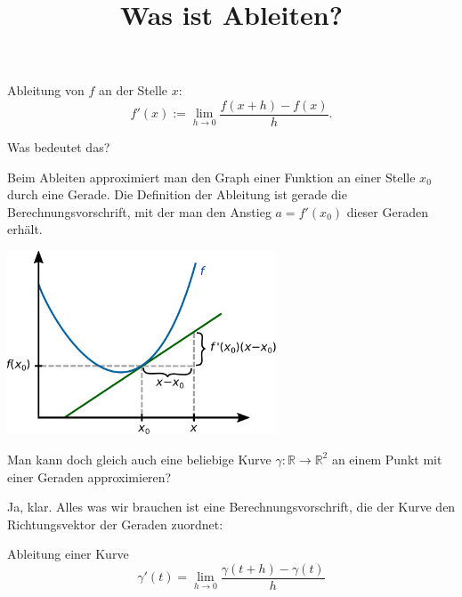 \documentclass[9pt]{beamer}
\title{Was ist Ableiten?}
\date{}
\newcommand{\R}{\mathbb R}
\begin{document}
\maketitle


\begin{frame}

\begin{Definition}
Ableitung von $f$ an der Stelle $x$:
\[f'(x) := \lim_{h\to 0}\frac{f(x+h)-f(x)}{h}.\]
\end{Definition}

\end{frame}


\begin{frame}
Was bedeutet das?
\end{frame}

\begin{frame}
Beim Ableiten approximiert man den Graph einer Funktion an einer
Stelle $x_0$ durch eine Gerade. Die Definition der Ableitung ist
gerade die Berechnungsvorschrift, mit der man den Anstieg $a=f'(x_0)$
dieser Geraden erhält.
\end{frame}

\begin{frame}
\begin{center}
\includegraphics[width=0.6\textwidth]{img/Ableitung.pdf}
\end{center}
\end{frame}

\begin{frame}
Man kann doch gleich auch eine beliebige Kurve $\gamma\colon\R\to\R^2$
an einem Punkt mit einer Geraden approximieren?
\end{frame}

\begin{frame}
Ja, klar. Alles was wir brauchen ist eine Berechnungsvorschrift,
die der Kurve den Richtungsvektor der Geraden zuordnet:
\begin{block}{Ableitung einer Kurve}
\[\gamma'(t) = \lim_{h\to 0}\frac{\gamma(t+h)-\gamma(t)}{h}\]
\end{block}
\end{frame}
\end{document}
